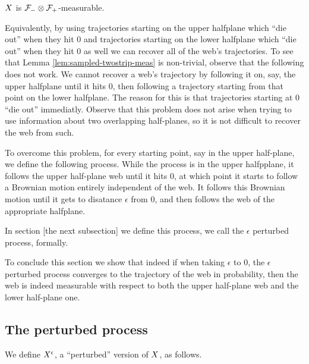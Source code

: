 {\begin{lemma}
  \label{lem:sampled-twostrip-meas}
  $X$ is $\mathcal{F}_{-} \otimes \mathcal{F}_{+}$-measurable.
\end{lemma}

Equivalently, by using trajectories starting on the upper halfplane
which  ``die out'' when they hit $0$ and trajectories starting on
the lower halfplane which ``die out'' when they hit $0$ as well we
can recover all of the web's trajectories.
To see that Lemma \ref{lem:sampled-twostrip-meas} is non-trivial,
observe that the following does not work. We cannot recover a web's
trajectory by following it on, say, the upper halfplane until it
hits 0, then following a trajectory starting from that point on the
lower halfplane. The reason for this is that trajectories starting at
0 ``die out'' immediatly. Observe that this problem does not arise when
trying to use information about two overlapping half-planes, so it is
not difficult to recover the web from such.

To overcome this problem, for every starting point, say in the upper
half-plane, we define the following process. While the process is in
the upper halfpplane, it follows the upper half-plane web until it hits
$0$, at which point it starts to follow a Brownian motion entirely
independent of the web. It follows this Brownian motion until it gets
to disatance $\epsilon$ from 0, and then follows the web of the appropriate
halfplane.

In section [the next subsection] we define this process, we call the
$\epsilon$ perturbed process, formally.

To conclude this section we show that indeed if when taking $\epsilon$
to 0, the $\epsilon$ perturbed process converges to the trajectory of
the web in probability, then the web is indeed measurable with respect
to both the upper half-plane web and the lower half-plane one.

\subsection{The perturbed process}

{
\newcommand{\joinernoargs}{\psi}
\newcommand{\joiner}[2]{\joinernoargs_{{#1}{#2}}}
\newcommand{\joinerval}[1]{\joinernoargs_{#1}}
\begin{definition}
  \label{def:resamplede}
  We define $X^{\epsilon}$, a ``perturbed'' version of $X$, as
  follows.

  \newcommand{\bmweb}{\psi}


\end{definition}}}
